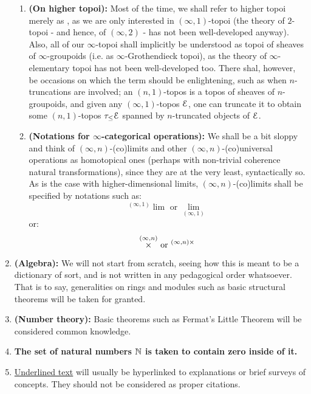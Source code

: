 \begin{enumerate}
\begin{enumerate}
                \item \textbf{(On higher topoi):} Most of the time, we shall refer to higher topoi merely as , as we are only interested in $(\infty, 1)$-topoi (the theory of $2$-topoi - and hence, of $(\infty, 2)$ - has not been well-developed anyway). Also, all of our $\infty$-topoi shall implicitly be understood as topoi of sheaves of $\infty$-groupoids (i.e. as $\infty$-Grothendieck topoi), as the theory of $\infty$-elementary topoi has not been well-developed too. There shal, however, be occasions on which the term  should be enlightening, such as when $n$-truncations are involved; an $(n, 1)$-topos is a topos of sheaves of $n$-groupoids, and given any $(\infty, 1)$-topos $\mathcal{E}$, one can truncate it to obtain some $(n, 1)$-topos $\tau_{\leq} \mathcal{E}$ spanned by $n$-truncated objects of $\mathcal{E}$. 
                \item \textbf{(Notations for $\infty$-categorical operations):} We shall be a bit sloppy and think of $(\infty, n)$-(co)limits and other $(\infty, n)$-(co)universal operations as homotopical ones (perhaps with non-trivial coherence natural transformations), since they are at the very least, syntactically so. As is the case with higher-dimensional limits, $(\infty, n)$-(co)limits shall be specified by notations such as:
                    $$\text{${}^{(\infty, 1)}\lim$ or $\underset{(\infty, 1)}{\lim}$}$$
                or:
                    $$\text{$\x^{(\infty, n)}$ or ${}^{(\infty, n)\x}$}$$
            \end{enumerate}
        \item \textbf{(Algebra):} We will not start from scratch, seeing how this is meant to be a dictionary of sort, and is not written in any pedagogical order whatsoever. That is to say, generalities on rings and modules such as basic structural theorems will be taken for granted.
        \item \textbf{(Number theory):} Basic theorems such as Fermat's Little Theorem will be considered common knowledge.
        \item \textbf{The set of natural numbers $\mathbb{N}$ is taken to contain zero inside of it.}
        \item \underline{Underlined text} will usually be hyperlinked to explanations or brief surveys of concepts. They should not be considered as proper citations.
    \end{enumerate}